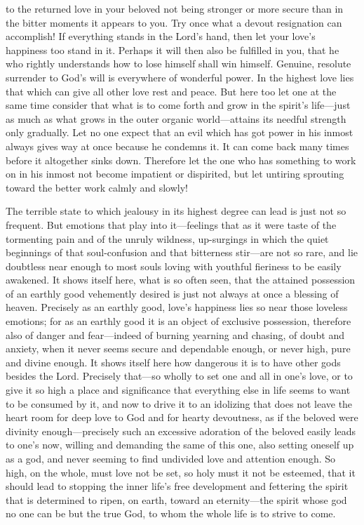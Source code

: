 \documentclass[12pt,a4paper]{book}
\begin{document}
to the returned love in your beloved not being stronger or more secure than
in the bitter moments it appears to you. Try once what a devout resignation
can accomplish! If everything stands in the Lord's hand, then let your
love's happiness too stand in it. Perhaps it will then also be fulfilled in
you, that he who rightly understands how to lose himself shall win himself.
Genuine, resolute surrender to God's will is everywhere of wonderful power.
In the highest love lies that which can give all other love rest and peace.
But here too let one at the same time consider that what is to come forth
and grow in the spirit's life---just as much as what grows in the outer
organic world---attains its needful strength only gradually. Let no one
expect that an evil which has got power in his inmost always gives way at
once because he condemns it. It can come back many times before it
altogether sinks down. Therefore let the one who has something to work on
in his inmost not become impatient or dispirited, but let untiring sprouting
toward the better work calmly and slowly!

The terrible state to which jealousy in its highest degree can lead is just
not so frequent. But emotions that play into it---feelings that as it were
taste of the tormenting pain and of the unruly wildness, up-surgings in
which the quiet beginnings of that soul-confusion and that bitterness
stir---are not so rare, and lie doubtless near enough to most souls loving
with youthful fieriness to be easily awakened. It shows itself here, what
is so often seen, that the attained possession of an earthly good
vehemently desired is just not always at once a blessing of heaven.
Precisely as an earthly good, love's happiness lies so near those loveless
emotions; for as an earthly good it is an object of exclusive possession,
therefore also of danger and fear---indeed of burning yearning and chasing,
of doubt and anxiety, when it never seems secure and dependable enough, or
never high, pure and divine enough. It shows itself here how dangerous it
is to have other gods besides the Lord. Precisely that---so wholly to set
one and all in one's love, or to give it so high a place and significance
that everything else in life seems to want to be consumed by it, and now to
drive it to an idolizing that does not leave the heart room for deep love
to God and for hearty devoutness, as if the beloved were divinity
enough---precisely such an excessive adoration of the beloved easily leads
to one's now, willing and demanding the same of this one, also setting
oneself up as a god, and never seeming to find undivided love and attention
enough. So high, on the whole, must love not be set, so holy must it not be
esteemed, that it should lead to stopping the inner life's free development
and fettering the spirit that is determined to ripen, on earth, toward an
eternity---the spirit whose god no one can be but the true God, to whom the
whole life is to strive to come.
\end{document}
